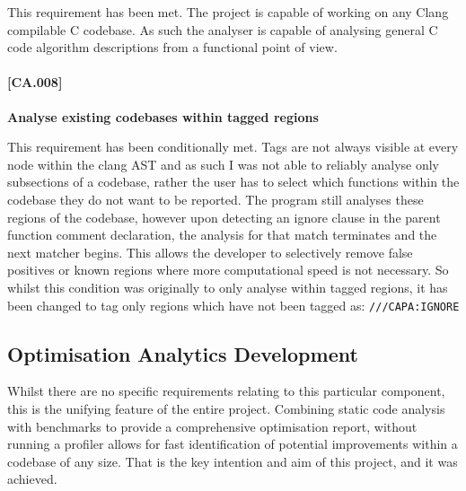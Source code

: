 This requirement has been met. The project is capable of working on any Clang compilable C codebase.
As such the analyser is capable of analysing general C code algorithm descriptions from a functional
point of view.

\paragraph{[CA.008]}
\textbf{Analyse existing codebases within tagged regions}

This requirement has been conditionally met. Tags are not always visible at every node within the
clang AST and as such I was not able to reliably analyse only subsections of a codebase, rather the
user has to select which functions within the codebase they do not want to be reported. The program
still analyses these regions of the codebase, however upon detecting an ignore clause in the parent
function comment declaration, the analysis for that match terminates and the next matcher begins.
This allows the developer to selectively remove false positives or known regions where more
computational speed is not necessary. So whilst this condition was originally to only analyse within
tagged regions, it has been changed to tag only regions which have not been tagged as:
{\lstinline{///CAPA:IGNORE}}


\subsection{Optimisation Analytics Development}

Whilst there are no specific requirements relating to this particular component, this is the
unifying feature of the entire project. Combining static code analysis with benchmarks to provide a
comprehensive optimisation report, without running a profiler allows for fast identification of
potential improvements within a codebase of any size. That is the key intention and aim of this
project, and it was achieved.

